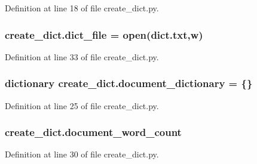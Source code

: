Definition at line 18 of file create\+\_\+dict.\+py.

\subsubsection[{\texorpdfstring{dict\+\_\+file}{dict_file}}]{\setlength{\rightskip}{0pt plus 5cm}create\+\_\+dict.\+dict\+\_\+file = open(\textquotesingle{}dict.\+txt\textquotesingle{},\textquotesingle{}w\textquotesingle{})}\hypertarget{namespacecreate__dict_ac24c44c9b8b29bc8a8411916d7a6b349}{}\label{namespacecreate__dict_ac24c44c9b8b29bc8a8411916d7a6b349}


Definition at line 33 of file create\+\_\+dict.\+py.

\subsubsection[{\texorpdfstring{document\+\_\+dictionary}{document_dictionary}}]{\setlength{\rightskip}{0pt plus 5cm}dictionary create\+\_\+dict.\+document\+\_\+dictionary = \{\}}\hypertarget{namespacecreate__dict_a523b5abb183f92cbb473ab778d8c7d9f}{}\label{namespacecreate__dict_a523b5abb183f92cbb473ab778d8c7d9f}


Definition at line 25 of file create\+\_\+dict.\+py.

\subsubsection[{\texorpdfstring{document\+\_\+word\+\_\+count}{document_word_count}}]{\setlength{\rightskip}{0pt plus 5cm}create\+\_\+dict.\+document\+\_\+word\+\_\+count}\hypertarget{namespacecreate__dict_afb09c644d11be14d22d9c194ce8904fb}{}\label{namespacecreate__dict_afb09c644d11be14d22d9c194ce8904fb}


Definition at line 30 of file create\+\_\+dict.\+py.

